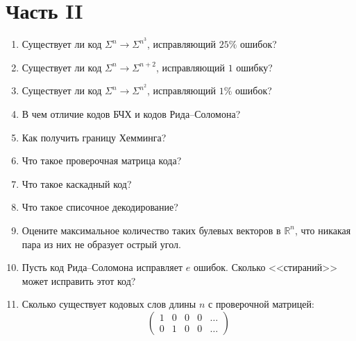 \section*{Часть II}
\begin{enumerate}
    \item Существует ли код $\Sigma^{n} \to \Sigma^{n^3}$, исправляющий $25\%$ ошибок?
    \item Существует ли код $\Sigma^{n} \to \Sigma^{n + 2}$, исправляющий $1$ ошибку?
    \item Существует ли код $\Sigma^{n} \to \Sigma^{n^2}$, исправляющий $1\%$ ошибок?
    \item В чем отличие кодов БЧХ и кодов Рида--Соломона?
    \item Как получить границу Хемминга?
    \item Что такое проверочная матрица кода?
    \item Что такое каскадный код?
    \item Что такое списочное декодирование?
    \item Оцените максимальное количество таких булевых векторов в $\mathbb{R}^n$, что никакая пара из
        них не образует острый угол.
    \item Пусть код Рида--Соломона исправляет $e$ ошибок. Сколько <<стираний>> может исправить этот код?
    \item Сколько существует кодовых слов длины $n$ с проверочной матрицей:
        $$
            \left( \begin{array}{ccccc}
                     1 & 0 & 0 & 0 & \dots \\
                     0 & 1 & 0 & 0 & \dots
                   \end{array}
            \right)
        $$
\end{enumerate}




